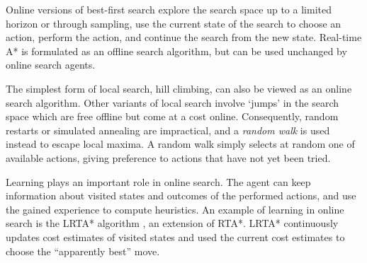 Online versions of best-first search explore the search space up to a
limited horizon or through sampling, use the current state
of the search to choose an action, perform the action, and continue
the search from the new state. Real-time A* is formulated as an offline
search algorithm, but can be used unchanged by online search agents.

The simplest form of local search, hill climbing, can also be
viewed as an online search algorithm. Other variants of local search
involve `jumps' in the search space which are free offline but come at
a cost online. Consequently, random restarts or simulated annealing
are impractical, and a {\em random walk} is used instead to escape
local maxima. A random walk simply selects at random one of available
actions, giving preference to actions that have not yet been tried.

Learning plays an important role in online search. The agent can keep
information about visited states and outcomes of the performed
actions, and use the gained experience to compute heuristics. An
example of learning in online search is the LRTA* algorithm
\cite{Korf.rta}, an extension of RTA*. LRTA* continuously
updates cost estimates of visited states and used the current cost
estimates to choose the ``apparently best'' move.
